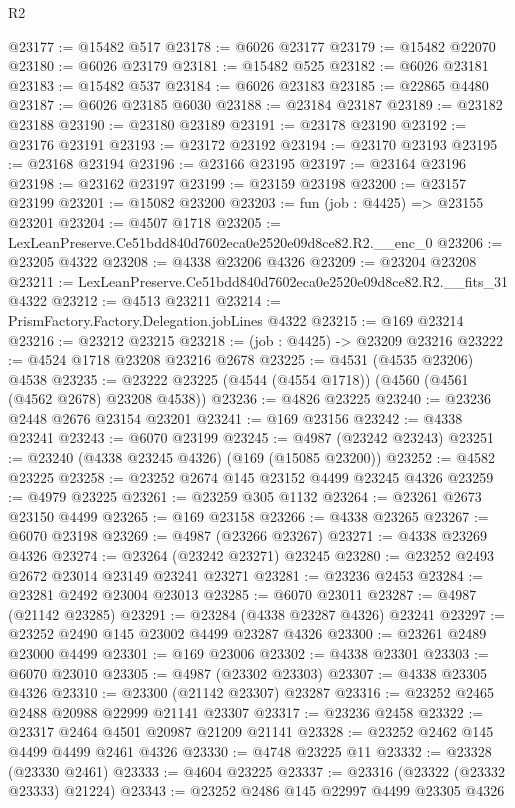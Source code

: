 \begin{lexlean}{R2}
\begin{coremodule}
@23177 := @15482 @517
@23178 := @6026 @23177
@23179 := @15482 @22070
@23180 := @6026 @23179
@23181 := @15482 @525
@23182 := @6026 @23181
@23183 := @15482 @537
@23184 := @6026 @23183
@23185 := @22865 @4480
@23187 := @6026 @23185 @6030
@23188 := @23184 @23187
@23189 := @23182 @23188
@23190 := @23180 @23189
@23191 := @23178 @23190
@23192 := @23176 @23191
@23193 := @23172 @23192
@23194 := @23170 @23193
@23195 := @23168 @23194
@23196 := @23166 @23195
@23197 := @23164 @23196
@23198 := @23162 @23197
@23199 := @23159 @23198
@23200 := @23157 @23199
@23201 := @15082 @23200
@23203 := fun (job : @4425) => @23155 @23201
@23204 := @4507 @1718
@23205 := LexLeanPreserve.Ce51bdd840d7602eca0e2520e09d8ce82.R2.__enc_0
@23206 := @23205 @4322
@23208 := @4338 @23206 @4326
@23209 := @23204 @23208
@23211 := LexLeanPreserve.Ce51bdd840d7602eca0e2520e09d8ce82.R2.__fits_31 @4322
@23212 := @4513 @23211
@23214 := PrismFactory.Factory.Delegation.jobLines @4322
@23215 := @169 @23214
@23216 := @23212 @23215
@23218 := (job : @4425) -> @23209 @23216
@23222 := @4524 @1718 @23208 @23216 @2678
@23225 := @4531 (@4535 @23206) @4538
@23235 := @23222 @23225 (@4544 (@4554 @1718)) (@4560 (@4561 (@4562 @2678) @23208 @4538))
@23236 := @4826 @23225
@23240 := @23236 @2448 @2676 @23154 @23201
@23241 := @169 @23156
@23242 := @4338 @23241
@23243 := @6070 @23199
@23245 := @4987 (@23242 @23243)
@23251 := @23240 (@4338 @23245 @4326) (@169 (@15085 @23200))
@23252 := @4582 @23225
@23258 := @23252 @2674 @145 @23152 @4499 @23245 @4326
@23259 := @4979 @23225
@23261 := @23259 @305 @1132
@23264 := @23261 @2673 @23150 @4499
@23265 := @169 @23158
@23266 := @4338 @23265
@23267 := @6070 @23198
@23269 := @4987 (@23266 @23267)
@23271 := @4338 @23269 @4326
@23274 := @23264 (@23242 @23271) @23245
@23280 := @23252 @2493 @2672 @23014 @23149 @23241 @23271
@23281 := @23236 @2453
@23284 := @23281 @2492 @23004 @23013
@23285 := @6070 @23011
@23287 := @4987 (@21142 @23285)
@23291 := @23284 (@4338 @23287 @4326) @23241
@23297 := @23252 @2490 @145 @23002 @4499 @23287 @4326
@23300 := @23261 @2489 @23000 @4499
@23301 := @169 @23006
@23302 := @4338 @23301
@23303 := @6070 @23010
@23305 := @4987 (@23302 @23303)
@23307 := @4338 @23305 @4326
@23310 := @23300 (@21142 @23307) @23287
@23316 := @23252 @2465 @2488 @20988 @22999 @21141 @23307
@23317 := @23236 @2458
@23322 := @23317 @2464 @4501 @20987 @21209 @21141
@23328 := @23252 @2462 @145 @4499 @4499 @2461 @4326
@23330 := @4748 @23225 @11
@23332 := @23328 (@23330 @2461)
@23333 := @4604 @23225
@23337 := @23316 (@23322 (@23332 @23333) @21224)
@23343 := @23252 @2486 @145 @22997 @4499 @23305 @4326

\end{coremodule}
\end{lexlean}
